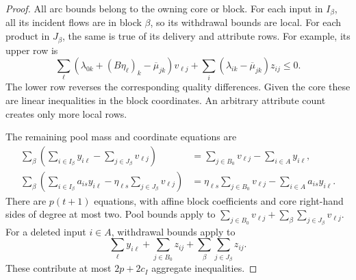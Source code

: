 \begin{proof}
All arc bounds belong to the owning core or block. For each input in
$I_\beta$, all its incident flows are in block $\beta$, so its withdrawal
bounds are local. For each product in $J_\beta$, the same is true of
its delivery and attribute rows. For example, its upper row is
\begin{equation}
 \sum_\ell(\lambda_{0k}+(B\eta_\ell)_k-\overline\mu_{jk})v_{\ell j}
 +\sum_i(\lambda_{ik}-\overline\mu_{jk})z_{ij}\le0.
 \label{s4:local-quality}
\end{equation}
The lower row reverses the corresponding quality differences. Given
the core these are linear inequalities in the block coordinates.
An arbitrary attribute count creates only more local rows.

The remaining pool mass and coordinate equations are
\begin{align}
 \sum_\beta\left(\sum_{i\in I_\beta}y_{i\ell}
                  -\sum_{j\in J_\beta}v_{\ell j}\right)
 &=\sum_{j\in B_0}v_{\ell j}-\sum_{i\in A}y_{i\ell},\\
 \sum_\beta\left(\sum_{i\in I_\beta}a_{is}y_{i\ell}
             -\eta_{\ell s}\sum_{j\in J_\beta}v_{\ell j}\right)
 &=\eta_{\ell s}\sum_{j\in B_0}v_{\ell j}
                  -\sum_{i\in A}a_{is}y_{i\ell}.
 \label{s4:pool-aggregates}
\end{align}
There are $p(t+1)$ equations, with affine block coefficients and
core right-hand sides of degree at most two. Pool bounds apply to
$\sum_{j\in B_0}v_{\ell j}+\sum_\beta\sum_{j\in J_\beta}v_{\ell j}$.
For a deleted input $i\in A$, withdrawal bounds apply to
\[
 \sum_\ell y_{i\ell}+\sum_{j\in B_0}z_{ij}
                      +\sum_\beta\sum_{j\in J_\beta}z_{ij}.
\]
These contribute at most $2p+2c_I$ aggregate inequalities.


\end{proof}
